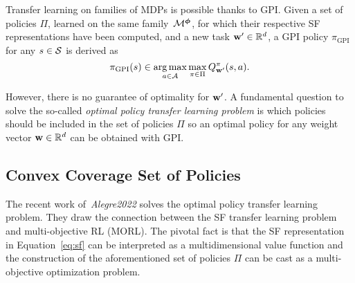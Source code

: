 Transfer learning on families of MDPs is possible thanks to GPI. Given a set of policies $\Pi$, learned on the same family~$\mathcal{M}^{\boldsymbol{\phi}}$, for which their respective SF representations have been computed, and a new task $\mathbf{w}'\in\mathbb{R}^d$, a GPI policy $\pi_{\text{GPI}}$ for any $s\in\mathcal{S}$ is derived as 
\begin{equation}
    \pi_{\text{GPI}}(s) \in \operatorname*{arg\,max}_{a\in\mathcal{A}} \max_{\pi\in\Pi} Q^\pi_{\mathbf{w}'}(s, a).
    \label{eq:gpi}
\end{equation}

However, there is no guarantee of optimality for $\mathbf{w}'$.
A fundamental question to solve the so-called \textit{optimal policy transfer learning problem} is which policies should be included in the set of policies $\Pi$ so an optimal policy for any weight vector $\mathbf{w}\in\mathbb{R}^d$ can be obtained with GPI. 

\subsection*{Convex Coverage Set of Policies}

%     
%     

The recent work of~\textit{Alegre2022} solves the optimal policy transfer learning problem. They draw the connection between the SF transfer learning problem and multi-objective RL (MORL). The pivotal fact is that the SF representation in Equation~\eqref{eq:sf} can be interpreted as a multidimensional value function and the construction of the aforementioned set of policies $\Pi$ can be cast as a multi-objective optimization problem.
 
